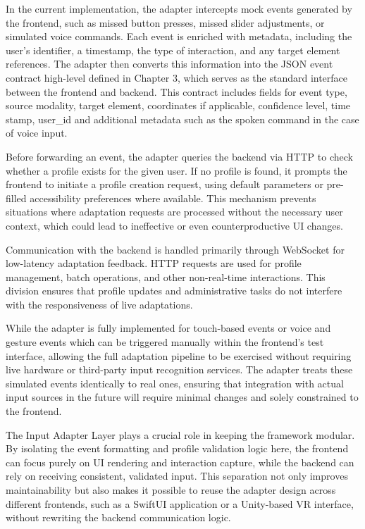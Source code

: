\documentclass[openany]{book}
\begin{document}
In the current implementation, the adapter intercepts mock events generated by the frontend, such as missed button presses, missed slider adjustments, or simulated voice commands. Each event is enriched with metadata, including the user’s identifier, a timestamp, the type of interaction, and any target element references. The adapter then converts this information into the JSON event contract high-level defined in Chapter 3, which serves as the standard interface between the frontend and backend. This contract includes fields for event type, source modality, target element, coordinates if applicable, confidence level, time stamp, user\_id and additional metadata such as the spoken command in the case of voice input.

Before forwarding an event, the adapter queries the backend via HTTP to check whether a profile exists for the given user. If no profile is found, it prompts the frontend to initiate a profile creation request, using default parameters or pre-filled accessibility preferences where available. This mechanism prevents situations where adaptation requests are processed without the necessary user context, which could lead to ineffective or even counterproductive UI changes.

Communication with the backend is handled primarily through WebSocket for low-latency adaptation feedback. HTTP requests are used for profile management, batch operations, and other non-real-time interactions. This division ensures that profile updates and administrative tasks do not interfere with the responsiveness of live adaptations.

While the adapter is fully implemented for touch-based events or voice and gesture events which can be triggered manually within the frontend’s test interface, allowing the full adaptation pipeline to be exercised without requiring live hardware or third-party input recognition services. The adapter treats these simulated events identically to real ones, ensuring that integration with actual input sources in the future will require minimal changes and solely constrained to the frontend.

The Input Adapter Layer plays a crucial role in keeping the framework modular. By isolating the event formatting and profile validation logic here, the frontend can focus purely on UI rendering and interaction capture, while the backend can rely on receiving consistent, validated input. This separation not only improves maintainability but also makes it possible to reuse the adapter design across different frontends, such as a SwiftUI application or a Unity-based VR interface, without rewriting the backend communication logic.
\end{document}
